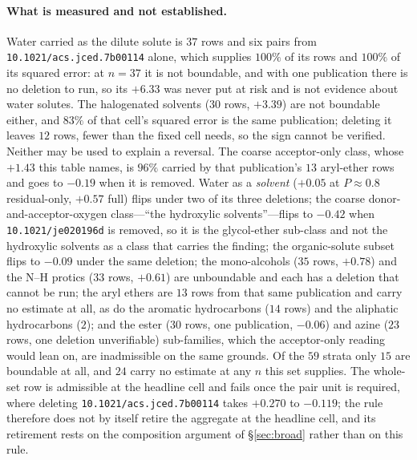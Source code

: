 \paragraph{What is measured and not established.} Water carried as the dilute solute is $37$ rows and six
pairs from \texttt{10.1021/acs.jced.7b00114} alone, which supplies $100\%$ of its rows and $100\%$ of
its squared error: at $n{=}37$ it is not boundable, and with one publication there is no deletion to
run, so its $+6.33$ was never put at risk and is not evidence about water solutes. The halogenated
solvents ($30$ rows, $+3.39$) are not boundable either, and $83\%$ of that cell's squared error is
the same publication; deleting it leaves $12$ rows, fewer than the fixed cell needs, so the sign
cannot be verified. Neither may be used to explain a reversal. The coarse acceptor-only class, whose
$+1.43$ this table names, is $96\%$ carried by that publication's $13$ aryl-ether rows and goes to
$-0.19$ when it is removed. Water as a \emph{solvent} ($+0.05$ at $P\approx0.8$ residual-only, $+0.57$
full) flips under two of its three deletions; the coarse donor-and-acceptor-oxygen class---``the
hydroxylic solvents''---flips to $-0.42$ when \texttt{10.1021/je020196d} is removed, so it is the
glycol-ether sub-class and not the hydroxylic solvents as a class that carries the finding; the
organic-solute subset flips to $-0.09$ under the same deletion; the mono-alcohols ($35$ rows,
$+0.78$) and the N--H
protics ($33$ rows, $+0.61$) are unboundable and each has a deletion that cannot be run; the aryl
ethers are $13$ rows from
that same publication and carry no estimate at all, as do the aromatic hydrocarbons ($14$ rows) and
the aliphatic hydrocarbons ($2$); and the ester ($30$ rows, one publication,
$-0.06$) and azine ($23$ rows, one deletion unverifiable) sub-families, which the acceptor-only
reading would lean on, are inadmissible on the same grounds. Of the $59$ strata only $15$ are
boundable at all, and $24$ carry no estimate at any $n$ this set supplies. The whole-set row is
admissible at the headline cell and fails once the
pair unit is required, where deleting \texttt{10.1021/acs.jced.7b00114} takes $+0.270$ to $-0.119$;
the rule therefore does not by itself retire the aggregate at the headline cell, and its retirement
rests on the composition argument of \S\ref{sec:broad} rather than on this rule.

